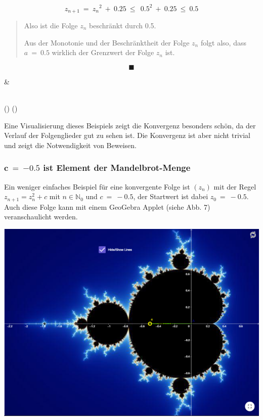 \documentclass[a4paper, 12pt]{book}
\begin{document}
\begin{longtable}[]
\begin{minipage}[b]{\linewidth}
\[z_{n + 1}\  = \ {z_{n}}^{2}\  + \ 0.25\  \leq \ \ {0.5}^{2}\  + \ 0.25\  \leq \ 0.5\]

\begin{quote}
Also ist die Folge \(z_{n}\) beschränkt durch 0.5.

Aus der Monotonie und der Beschränktheit der Folge \(z_{n}\) folgt also,
dass \(a\  = \ 0.5\) wirklich der Grenzwert der Folge \(z_{n}\) ist.
\end{quote}

\[\blacksquare\]
\end{minipage} & \begin{minipage}[b]{\linewidth}\raggedright
\end{minipage} \\
\midrule()
\endhead
\bottomrule()
\end{longtable}

Eine Visualisierung dieses Beispiels zeigt die Konvergenz besonders
schön, da der Verlauf der Folgenglieder gut zu sehen ist. Die Konvergenz
ist aber nicht trivial und zeigt die Notwendigkeit von Beweisen.

\hypertarget{mathbfc-mathbf-mathbf0.5-ist-element-der-mandelbrot-menge}{%
\subsubsection{\texorpdfstring{\(\mathbf{c\  = \ }\mathbf{-}\mathbf{0.5}\)
ist Element der
Mandelbrot-Menge}{\textbackslash mathbf\{c\textbackslash{}  = \textbackslash{} \}\textbackslash mathbf\{-\}\textbackslash mathbf\{0.5\} ist Element der Mandelbrot-Menge}}\label{mathbfc-mathbf-mathbf0.5-ist-element-der-mandelbrot-menge}}

Ein weniger einfaches Beispiel für eine konvergente Folge ist
\(\left( z_{n} \right)\) mit der Regel \(z_{n + 1} = z_{n}^{2} + c\) mit
\(n \in \mathbb{N}_{0}\) und \(c\  = \  - 0.5\), der Startwert ist dabei
\(z_{0}\  = \  - 0.5\). Auch diese Folge kann mit einem GeoGebra Applet
(siehe Abb. 7) veranschaulicht werden.

\includegraphics[width=\linewidth]{image12.png}
\end{document}
